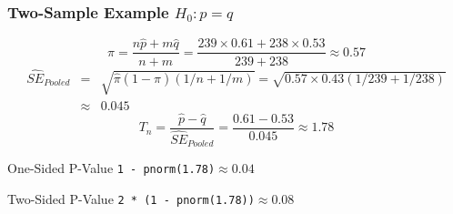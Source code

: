 \begin{frame}
	\frametitle{Two-Sample Example $H_0\colon p = q$}
	\small
$$\widehat{\pi} = \frac{n\widehat{p}+ m\widehat{q}}{n + m} = \frac{239 \times 0.61 + 238 \times 0.53}{239 + 238}\approx 0.57$$
	\begin{eqnarray*}
	\widehat{SE}_{Pooled} &=&  \sqrt{\widehat{\pi}(1-\widehat{\pi})\left( 1/n + 1/m \right) }= \sqrt{0.57 \times 0.43 (1/239 + 1/238)}\\
		&\approx& 0.045
	\end{eqnarray*}
$$T_n = \frac{\widehat{p} - \widehat{q}}{\widehat{SE}_{Pooled}}= \frac{0.61 - 0.53}{0.045} \approx 1.78$$

\vspace{-1em}
\begin{block}
	{One-Sided P-Value}
	\texttt{1 - pnorm(1.78)}$\approx 0.04$
\end{block}\begin{block}
	{Two-Sided P-Value}
	\texttt{2 * (1 - pnorm(1.78))}$\approx 0.08$
\end{block}
\end{frame}
